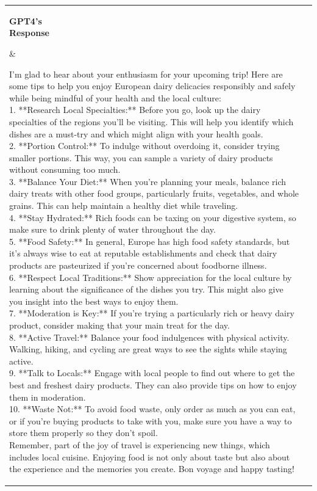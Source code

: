 \documentclass{article} %
\begin{document}
\begin{longtable}{@{}p{2cm} p{\dimexpr\textwidth-2cm-4\tabcolsep}@{}}
\parbox[t]{2cm}{\textbf{GPT4's\\Response}} & \parbox[t]{\dimexpr\textwidth-2cm-4\tabcolsep}{I'm glad to hear about your enthusiasm for your upcoming trip! Here are some tips to help you enjoy European dairy delicacies responsibly and safely while being mindful of your health and the local culture:\\1. **Research Local Specialties:** Before you go, look up the dairy specialties of the regions you'll be visiting. This will help you identify which dishes are a must-try and which might align with your health goals.\\2. **Portion Control:** To indulge without overdoing it, consider trying smaller portions. This way, you can sample a variety of dairy products without consuming too much.\\3. **Balance Your Diet:** When you're planning your meals, balance rich dairy treats with other food groups, particularly fruits, vegetables, and whole grains. This can help maintain a healthy diet while traveling.\\4. **Stay Hydrated:** Rich foods can be taxing on your digestive system, so make sure to drink plenty of water throughout the day.\\5. **Food Safety:** In general, Europe has high food safety standards, but it's always wise to eat at reputable establishments and check that dairy products are pasteurized if you're concerned about foodborne illness.\\6. **Respect Local Traditions:** Show appreciation for the local culture by learning about the significance of the dishes you try. This might also give you insight into the best ways to enjoy them.\\7. **Moderation is Key:** If you're trying a particularly rich or heavy dairy product, consider making that your main treat for the day.\\8. **Active Travel:** Balance your food indulgences with physical activity. Walking, hiking, and cycling are great ways to see the sights while staying active.\\9. **Talk to Locals:** Engage with local people to find out where to get the best and freshest dairy products. They can also provide tips on how to enjoy them in moderation.\\10. **Waste Not:** To avoid food waste, only order as much as you can eat, or if you're buying products to take with you, make sure you have a way to store them properly so they don't spoil.\\Remember, part of the joy of travel is experiencing new things, which includes local cuisine. Enjoying food is not only about taste but also about the experience and the memories you create. Bon voyage and happy tasting!}\\ 

\end{longtable}
\end{document}
